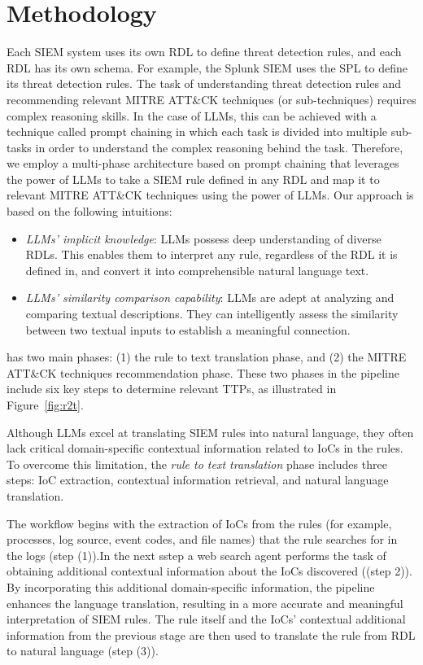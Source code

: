 
\section{\label{sec:method}Methodology}

Each SIEM system uses its own RDL to define threat detection rules, and each RDL has its own schema.
For example, the Splunk SIEM uses the SPL to define its threat detection rules.
The task of understanding threat detection rules and recommending relevant MITRE ATT\&CK techniques (or sub-techniques) requires complex reasoning skills.
In the case of LLMs, this can be achieved with a technique called prompt chaining in which each task is divided into multiple sub-tasks in order to understand the complex reasoning behind the task.
Therefore, we employ a multi-phase architecture based on prompt chaining that leverages the power of LLMs to take a SIEM rule defined in any RDL and map it to relevant MITRE ATT\&CK techniques using the power of LLMs.
Our approach is based on the following intuitions:
\begin{itemize}[nosep,leftmargin=*]
    \item \textit{LLMs' implicit knowledge}: LLMs possess deep understanding of diverse RDLs. This enables them to interpret any rule, regardless of the RDL it is defined in, and convert it into comprehensible natural language text.
    \item \textit{LLMs' similarity comparison capability}: LLMs are adept at analyzing and comparing textual descriptions. 
    They can intelligently assess the similarity between two textual inputs to establish a meaningful connection.
\end{itemize}

\methodName has two main phases: (1) the rule to text translation phase, and (2) the MITRE ATT\&CK techniques recommendation phase.
These two phases in the pipeline include six key steps to determine relevant TTPs, as illustrated in Figure~\ref{fig:r2t}.

Although LLMs excel at translating SIEM rules into natural language, they often lack critical domain-specific contextual information related to IoCs in the rules.
To overcome this limitation, the \textit{rule to text translation} phase includes three steps: IoC extraction, contextual information retrieval, and natural language translation.

The workflow begins with the extraction of IoCs from the rules (for example, processes, log source, event codes, and file names) that the rule searches for in the logs (step (1)).In the next sstep a web search agent performs the task of obtaining additional contextual information about the IoCs discovered ((step 2)).
By incorporating this additional domain-specific information, the pipeline enhances the language translation, resulting in a more accurate and meaningful interpretation of SIEM rules.
The rule itself and the IoCs' contextual additional information from the previous stage are then used to translate the rule from RDL to natural language (step (3)).

